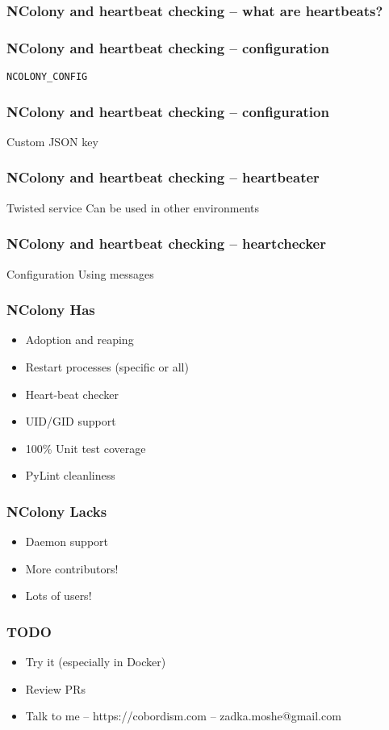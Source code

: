 \documentclass{beamer}
\begin{document}
\begin{frame}[fragile]
\frametitle{NColony and heartbeat checking -- what are heartbeats?}
\end{frame}

\begin{frame}[fragile]
\frametitle{NColony and heartbeat checking -- configuration}
\begin{lstlisting}
NCOLONY_CONFIG
\end{lstlisting}
\end{frame}

\begin{frame}[fragile]
\frametitle{NColony and heartbeat checking -- configuration}
Custom JSON key
\end{frame}

\begin{frame}[fragile]
\frametitle{NColony and heartbeat checking -- heartbeater}
Twisted service
Can be used in other environments
\end{frame}

\begin{frame}[fragile]
\frametitle{NColony and heartbeat checking -- heartchecker}
Configuration
Using messages
\end{frame}

\begin{frame}[fragile]
\frametitle{NColony Has}
\begin{itemize}
\item Adoption and reaping \pause
\item Restart processes (specific or all) \pause
\item Heart-beat checker \pause
\item UID/GID support \pause
\item 100\% Unit test coverage \pause
\item PyLint cleanliness
\end{itemize}
\end{frame}

\begin{frame}[fragile]
\frametitle{NColony Lacks}
\begin{itemize}
\item Daemon support \pause
\item More contributors! \pause
\item Lots of users!
\end{itemize}
\end{frame}

\begin{frame}[fragile]
\frametitle{TODO}
\begin{itemize}
\item Try it (especially in Docker) \pause
\item Review PRs \pause
\item Talk to me -- https://cobordism.com -- zadka.moshe@gmail.com
\end{itemize}
\end{frame}
\end{document}
